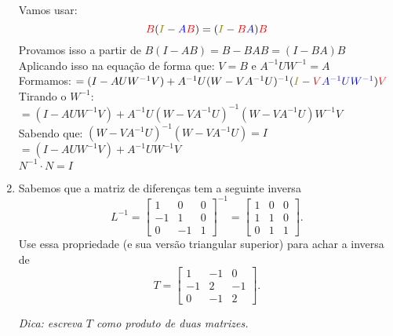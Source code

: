\documentclass[leqno]{article}
\begin{document}
\begin{enumerate}
\begin{sol}
			\newline
			Vamos usar: $$\textcolor{red}{B}(\textcolor{olive}{I} - \textcolor{blue}{A}\textcolor{red}{B}) = (\textcolor{olive}{I} - \textcolor{red}{B}\textcolor{blue}{A})\textcolor{red}{B}$$
			Provamos isso a partir de $B(I - AB) = B - BAB = (I - BA)B$\\
			\newline
			Aplicando isso na equação de forma que: $V = B$ e $A^{-1}UW^{-1} = A$\\
			Formamos:
			\newline
			$= (I - AUW^{-1}V) + A^{-1}U(W - VA^{-1}U)^{-1}(\textcolor{olive}{I} - \textcolor{red}{V}\textcolor{blue}{A^{-1}UW^{-1}})\textcolor{red}{V}$\\
			\newline
			Tirando o $W^{-1}$:
			\newline
			$= (I - AUW^{-1}V) + A^{-1}U(W - VA^{-1}U)^{-1}(W - VA^{-1}U)W^{-1}V$\\
			\newline
			Sabendo que: $(W - VA^{-1}U)^{-1}(W - VA^{-1}U) = I$\\
			\newline
			$= (I - AUW^{-1}V) + A^{-1}UW^{-1}V$\\
			\newline
			$N^{-1} \cdot N = I$
		\end{sol} 
		
		\item Sabemos que a matriz de diferenças tem a seguinte inversa
		$$L^{-1} = \begin{bmatrix}
			1 & 0 & 0\\
			-1 & 1 & 0\\
			0 & -1 & 1
		\end{bmatrix}^{-1} = \begin{bmatrix}
			1 & 0 & 0\\
			1 & 1 & 0\\
			0 & 1 & 1
		\end{bmatrix}.$$
		Use essa propriedade (e sua versão triangular superior) para achar a inversa de
		$$T = \begin{bmatrix}
			1 & -1 & 0\\
			-1 & 2 & -1\\
			0 & -1 & 2
		\end{bmatrix}.$$
		
		\textit{Dica: escreva $T$ como produto de duas matrizes.}
		

\end{enumerate}
\end{document}
